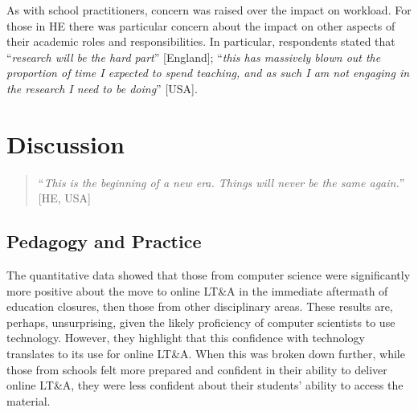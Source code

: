 \documentclass[conference]{IEEEtran}
\begin{document}
As with school practitioners, concern was raised over the impact on
workload. For those in HE there was particular concern about the
impact on other aspects of their academic roles and
responsibilities. In particular, respondents stated that
``{\emph{research will be the hard part}}'' [England]; ``{\emph{this has
massively blown out the proportion of time I expected to spend
teaching, and as such I am not engaging in the research I need to be
doing}}'' [USA].


\section{Discussion}\label{discussion}


\begin{quotation}
``{\emph{This is the beginning of a new era. Things will never be the
same again.}}'' [HE, USA]
\end{quotation}


\subsection{Pedagogy and Practice}

The quantitative data showed that those from computer science were
significantly more positive about the move to online LT\&A in the
immediate aftermath of education closures, then those from other
disciplinary areas. These results are, perhaps, unsurprising, given
the likely proficiency of computer scientists to use
technology. However, they highlight that this confidence with
technology translates to its use for online LT\&A. When this was
broken down further, while those from schools felt more prepared and
confident in their ability to deliver online LT\&A, they were less
confident about their students’ ability to access the material.
\end{document}

